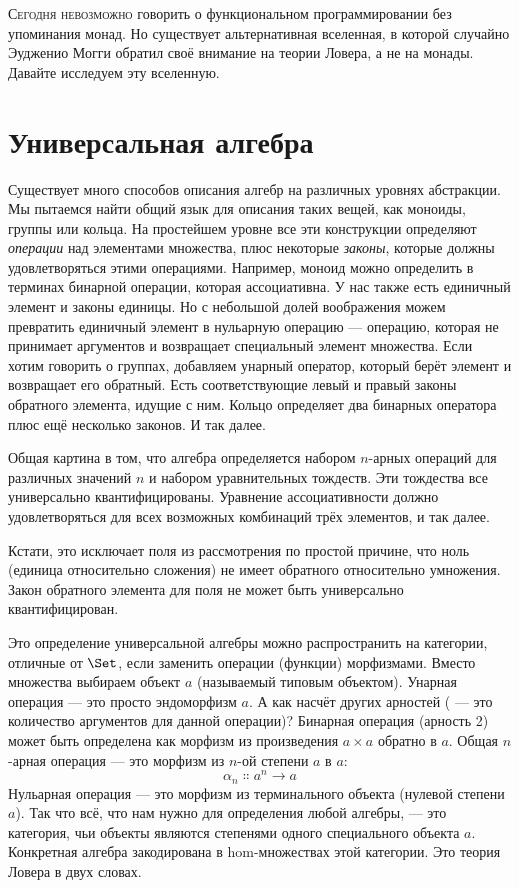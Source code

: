 
\lettrine[lhang=0.17]{С}{егодня невозможно} говорить о функциональном программировании без упоминания
монад. Но существует альтернативная вселенная, в которой случайно
Эудженио Могги обратил своё внимание на теории Ловера, а не на
монады. Давайте исследуем эту вселенную.

\section{Универсальная алгебра}

Существует много способов описания алгебр на различных уровнях
абстракции. Мы пытаемся найти общий язык для описания таких вещей, как
моноиды, группы или кольца. На простейшем уровне все эти
конструкции определяют \emph{операции} над элементами множества, плюс некоторые
\emph{законы}, которые должны удовлетворяться этими операциями. Например,
моноид можно определить в терминах бинарной операции, которая
ассоциативна. У нас также есть единичный элемент и законы единицы. Но с
небольшой долей воображения можем превратить единичный элемент в нульарную
операцию --- операцию, которая не принимает аргументов и возвращает специальный
элемент множества. Если хотим говорить о группах, добавляем унарный
оператор, который берёт элемент и возвращает его обратный. Есть
соответствующие левый и правый законы обратного элемента, идущие с ним. Кольцо определяет
два бинарных оператора плюс ещё несколько законов. И так далее.

Общая картина в том, что алгебра определяется набором $n$-арных
операций для различных значений $n$ и набором уравнительных тождеств.
Эти тождества все универсально квантифицированы. Уравнение ассоциативности
должно удовлетворяться для всех возможных комбинаций трёх
элементов, и так далее.

Кстати, это исключает поля из рассмотрения по простой
причине, что ноль (единица относительно сложения) не имеет обратного относительно
умножения. Закон обратного элемента для поля не может быть
универсально квантифицирован.

Это определение универсальной алгебры можно распространить на категории,
отличные от $\Set$, если заменить операции (функции)
морфизмами. Вместо множества выбираем объект $a$ (называемый
типовым объектом). Унарная операция — это просто эндоморфизм
$a$. А как насчёт других арностей ( — это количество
аргументов для данной операции)? Бинарная операция (арность 2) может быть
определена как морфизм из произведения $a\times{}a$ обратно в $a$.
Общая $n$-арная операция — это морфизм из $n$-ой степени
$a$ в $a$:
\[\alpha_n \Colon a^n \to a\]
Нульарная операция — это морфизм из терминального объекта (нулевой
степени $a$). Так что всё, что нам нужно для определения любой алгебры, — это
категория, чьи объекты являются степенями одного специального объекта $a$.
Конкретная алгебра закодирована в hom-множествах этой категории. Это
теория Ловера в двух словах.

